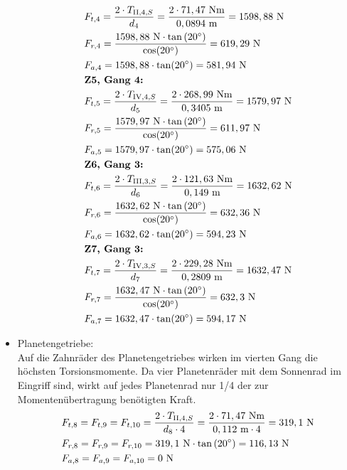\begin{itemize}
\begin{align*}
	&F_{t,4} = \frac{2\cdot T_{\mathrm{II},4,S}}{d_4} = \frac{2 \cdot 71,47 \text{ Nm}}{0,0894 \text{ m}} = 1598,88 \text{ N}\\ 
	&F_{r,4} = \frac{1598,88 \text{ N} \cdot \tan{(20^\circ)}}{\cos(20^\circ)} = 619,29\text{ N}\\ 
	&F_{a,4} = 1598,88 \cdot \tan(20^\circ) = 581,94 \text{ N}\\
&\textbf{Z5, Gang 4:} \\
	&F_{t,5} = \frac{2\cdot T_{\mathrm{IV},4,S}}{d_5} = \frac{2 \cdot 268,99 \text{ Nm}}{0,3405 \text{ m}} = 1579,97 \text{ N}\\ 
	&F_{r,5} = \frac{1579,97 \text{ N} \cdot \tan{(20^\circ)}}{\cos(20^\circ)} = 611,97\text{ N}\\ 
	&F_{a,5} = 1579,97 \cdot \tan(20^\circ) = 575,06 \text{ N}\\
&\textbf{Z6, Gang 3:} \\
	&F_{t,6} = \frac{2\cdot T_{\mathrm{III},3,S}}{d_6} = \frac{2 \cdot 121,63 \text{ Nm}}{0,149 \text{ m}} = 1632,62 \text{ N}\\ 
	&F_{r,6} = \frac{1632,62 \text{ N} \cdot \tan{(20^\circ)}}{\cos(20^\circ)} = 632,36\text{ N}\\ 
	&F_{a,6} = 1632,62 \cdot \tan(20^\circ) = 594,23 \text{ N}\\
&\textbf{Z7, Gang 3:} \\
	&F_{t,7} = \frac{2\cdot T_{\mathrm{IV},3,S}}{d_7} = \frac{2 \cdot 229,28 \text{ Nm}}{0,2809 \text{ m}} = 1632,47 \text{ N}\\ 
	&F_{r,7} = \frac{1632,47 \text{ N} \cdot \tan{(20^\circ)}}{\cos(20^\circ)} = 632,3\text{ N}\\ 
	&F_{a,7} = 1632,47 \cdot \tan(20^\circ) = 594,17 \text{ N}\\
\end{align*}
\item Planetengetriebe: \\
Auf die Zahnräder des Planetengetriebes wirken im vierten Gang die höchsten Torsionsmomente. Da vier Planetenräder mit dem Sonnenrad im Eingriff sind, wirkt auf jedes Planetenrad nur 1/4 der zur Momentenübertragung benötigten Kraft.
\begin{align*}
	&F_{t,8} = F_{t,9}= F_{t,10}=\frac{2\x T_{\mathrm{II},4,S}}{d_8 \x 4} = \frac{2 \x 71,47 \text{ Nm}}{0,112 \text{ m} \x 4} = 319,1\text{ N}\\ 
	&F_{r,8} = F_{r,9}= F_{r,10}=319,1 \text{ N} \x \tan{(20^\circ)} = 116,13\text{ N}\\ 
	&F_{a,8} = F_{a,9}= F_{a,10}=0 \text{ N}\\

\end{align*}
\end{itemize}
